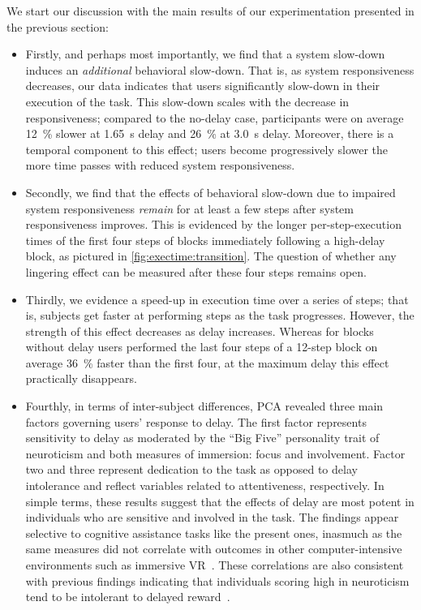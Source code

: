 
We start our discussion with the main results of our experimentation presented in the previous section:

\begin{itemize}
    \item Firstly, and perhaps most importantly, we find that a system slow-down induces an \textit{additional} behavioral slow-down.
          That is, as system responsiveness decreases, our data indicates that users significantly slow-down in their execution of the task.
          This slow-down scales with the decrease in responsiveness; compared to the no-delay case, participants were on average \SI{12}{\percent} slower at \SI{1.65}{\second} delay and \SI{26}{\percent} at \SI{3.0}{\second} delay.
          Moreover, there is a temporal component to this effect; users become progressively slower the more time passes with reduced system responsiveness.

    \item Secondly, we find that the effects of behavioral slow-down due to impaired system responsiveness \emph{remain} for at least a few steps after system responsiveness improves.
          This is evidenced by the longer per-step-execution times of the first four steps of blocks immediately following a high-delay block, as pictured in \cref{fig:exectime:transition}.
          The question of whether any lingering effect can be measured after these four steps remains open.

    \item Thirdly, we evidence a speed-up in execution time over a series of steps; that is, subjects get faster at performing steps as the task progresses.
          However, the strength of this effect decreases as delay increases.
          Whereas for blocks without delay users performed the last four steps of a 12-step block on average \SI{36}{\percent} faster than the first four, at the maximum delay this effect practically disappears.

    \item Fourthly, in terms of inter-subject differences, PCA revealed three main factors governing users' response to delay.
          The first factor represents sensitivity to delay as moderated by the ``Big Five'' personality trait of neuroticism and both measures of immersion: focus and involvement.
          Factor two and three represent dedication to the task as opposed to delay intolerance and reflect variables related to attentiveness, respectively.
          In simple terms, these results suggest that the effects of delay are most potent in individuals who are sensitive and involved in the task.
          The findings appear selective to cognitive assistance tasks like the present ones, inasmuch as the same measures did not correlate with outcomes in other computer-intensive environments such as immersive VR~\cite{quesnel2018you}.
          These correlations are also consistent with previous findings indicating that individuals scoring high in neuroticism tend to be intolerant to delayed reward~\cite{hirsh2008delay}.
\end{itemize}

